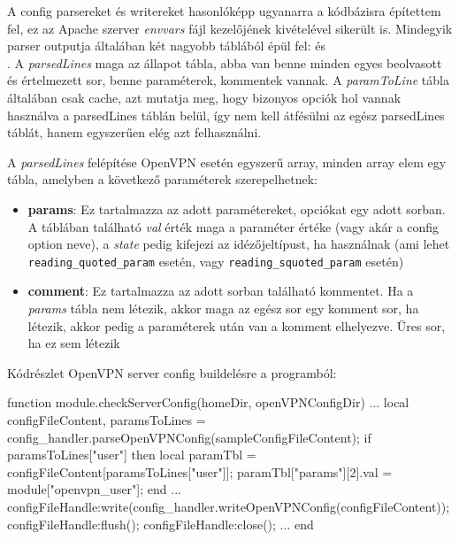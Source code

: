 A config parsereket és writereket hasonlóképp ugyanarra a kódbázisra építettem fel, ez az Apache szerver \textit{envvars} fájl kezelőjének kivételével sikerült is. Mindegyik parser outputja általában két nagyobb táblából épül fel: \texttt{} és\\\texttt{}.
A \textit{parsedLines} maga az állapot tábla, abba van benne minden egyes beolvasott és értelmezett sor, benne paraméterek, kommentek vannak. A \textit{paramToLine} tábla általában csak cache, azt mutatja meg, hogy bizonyos opciók hol vannak használva a parsedLines táblán belül, így nem kell átfésülni az egész parsedLines táblát, hanem egyszerűen elég azt felhasználni.

A \textit{parsedLines} felépítése OpenVPN esetén egyszerű array, minden array elem egy tábla, amelyben a következő paraméterek szerepelhetnek:

\begin{itemize}
    \item \textbf{params}: Ez tartalmazza az adott paramétereket, opciókat egy adott sorban. A táblában található \textit{val} érték maga a paraméter értéke (vagy akár a config option neve), a \textit{state} pedig kifejezi az idézőjeltípust, ha használnak (ami lehet \texttt{reading\_quoted\_param}  esetén, vagy \texttt{reading\_squoted\_param}  esetén)
    \item \textbf{comment}: Ez tartalmazza az adott sorban található kommentet. Ha a \textit{params} tábla nem létezik, akkor maga az egész sor egy komment sor, ha létezik, akkor pedig a paraméterek után van a komment elhelyezve. Üres sor, ha ez sem létezik
\end{itemize}

Kódrészlet OpenVPN server config buildelésre a programból:

\begin{lua}
function module.checkServerConfig(homeDir, openVPNConfigDir)
...
    local configFileContent, paramsToLines = config_handler.parseOpenVPNConfig(sampleConfigFileContent);
    if paramsToLines["user"] then
        local paramTbl = configFileContent[paramsToLines["user"]];
        paramTbl["params"][2].val = module["openvpn_user"];
    end
...
    configFileHandle:write(config_handler.writeOpenVPNConfig(configFileContent));
    configFileHandle:flush();
    configFileHandle:close();
...
end
\end{lua}
\pagebreak

